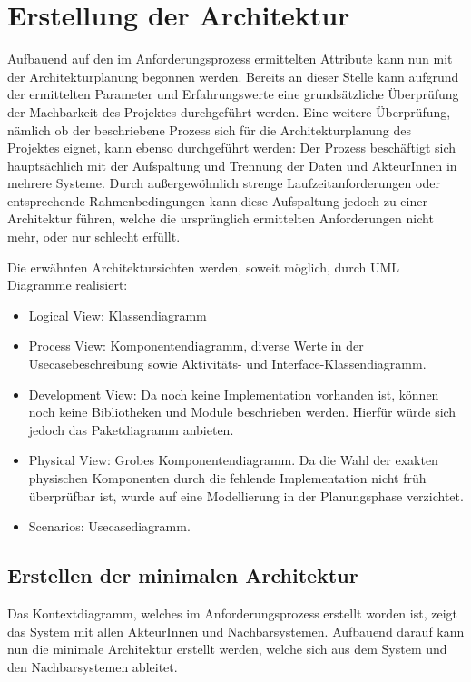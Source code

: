 \chapter{Erstellung der Architektur}
Aufbauend auf den im Anforderungsprozess ermittelten Attribute kann nun mit der Architekturplanung begonnen werden. Bereits an dieser Stelle kann aufgrund der ermittelten Parameter und Erfahrungswerte eine grundsätzliche Überprüfung der Machbarkeit des Projektes durchgeführt werden. Eine weitere Überprüfung, nämlich ob der beschriebene Prozess sich für die Architekturplanung des Projektes eignet, kann ebenso durchgeführt werden: Der Prozess beschäftigt sich hauptsächlich mit der Aufspaltung und Trennung der Daten und AkteurInnen in mehrere Systeme. Durch außergewöhnlich strenge Laufzeitanforderungen oder entsprechende Rahmenbedingungen kann diese Aufspaltung jedoch zu einer Architektur führen, welche die ursprünglich ermittelten Anforderungen nicht mehr, oder nur schlecht erfüllt.

Die erwähnten Architektursichten werden, soweit möglich, durch UML Diagramme realisiert:

\begin{itemize}
  \item Logical View: Klassendiagramm
  \item Process View: Komponentendiagramm, diverse Werte in der Usecasebeschreibung sowie Aktivitäts- und Interface-Klassendiagramm.
  \item Development View: Da noch keine Implementation vorhanden ist, können noch keine Bibliotheken und Module beschrieben werden. Hierfür würde sich jedoch das Paketdiagramm anbieten.
  \item Physical View: Grobes Komponentendiagramm. Da die Wahl der exakten physischen Komponenten durch die fehlende Implementation nicht früh überprüfbar ist, wurde auf eine Modellierung in der Planungsphase verzichtet.
  \item Scenarios: Usecasediagramm.
\end{itemize}

\section{Erstellen der minimalen Architektur}
Das Kontextdiagramm, welches im Anforderungsprozess erstellt worden ist, zeigt das System mit allen AkteurInnen und Nachbarsystemen. Aufbauend darauf kann nun die minimale Architektur erstellt werden, welche sich aus dem System und den Nachbarsystemen ableitet.

